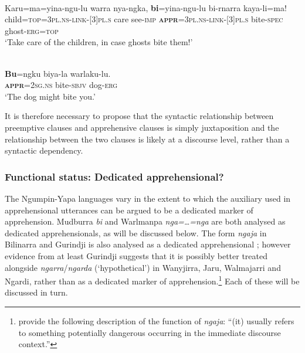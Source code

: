 \documentclass[output=paper,colorlinks,citecolor=brown]{langscibook}
\begin{document}
\ea 
{} \\
\gll Karu=ma=yina-ngu-lu warra nya-ngka,  \textbf{bi}=yina-ngu-lu bi-rnarra kaya-li=ma! \\
child=\textsc{top=3pl.ns-link-[3]pl.s} care see-\textsc{imp} \textsc{\textbf{appr}=3pl.ns-link-[3]pl.s} bite-\textsc{spec} ghost-\textsc{erg=top} \\
\glt `Take care of the children, in case ghosts bite them!'
\label{ex:bro47}
\z

\ea 
{} \\
\gll \textbf{Bu}=ngku biya-la warlaku-lu. \\
\textsc{\textbf{appr}=2sg.ns} bite-\textsc{sbjv} dog-\textsc{erg} \\
\glt `The dog might bite you.'
\label{ex:bro48}
\z

 It is therefore necessary to propose that the syntactic relationship between preemptive clauses and apprehensive clauses is simply juxtaposition and the relationship between the two clauses is likely at a discourse level, rather than a syntactic dependency.


\subsubsection{Functional status: Dedicated apprehensional?}
\label{subsubsec:functionalstatus}

The Ngumpin-Yapa languages vary in the extent to which the auxiliary used in apprehensional utterances can be argued to be a dedicated marker of apprehension. Mudburra \textit{bi} and Warlmanpa \textit{nga=\ldots=nga} are both analysed as dedicated apprehensionals, as will be discussed below. The form \textit{ngaja} in Bilinarra and Gurindji is also analysed as a dedicated apprehensional \citep[419]{meakins_grammar_2014}; however evidence from at least Gurindji suggests that it is possibly better treated alongside \textit{ngarra}/\textit{ngarda} (`hypothetical') in Wanyjirra, Jaru, Walmajarri and Ngardi, rather than as a dedicated marker of apprehension.\footnote{\citet[305]{meakins_grammar_2014} provide the following description of the function of \textit{ngaja}: ``(it) usually refers to something potentially dangerous occurring in the immediate discourse context.''} Each of these will be discussed in turn.


\end{document}
